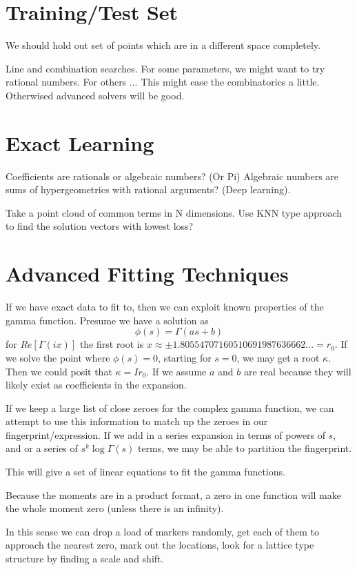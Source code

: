 \documentclass{article}
\begin{document}
\section{Training/Test Set}
We should hold out set of points which are in a different space completely. 

Line and combination searches. 
For some parameters, we might want to try rational numbers.
For others ...
This might ease the combinatorics a little.
Otherwised advanced solvers will be good.


\section{Exact Learning}
Coefficients are rationals or algebraic numbers? (Or Pi)
Algebraic numbers are sums of hypergeometrics with rational arguments? (Deep learning).

Take a point cloud of common terms in N dimensions.
Use KNN type approach to find the solution vectors with lowest loss?




\section{Advanced Fitting Techniques}
If we have exact data to fit to, then we can exploit known properties of the gamma function. Presume we have a solution as 
$$
\phi(s) = \Gamma(a s + b)
$$
for $Re[\Gamma(ix)]$ the first root is $x \approx \pm 1.80554707160510691987636662... = r_0 $. If we solve the point where $\phi(s)=0$, starting for $s=0$, we may get a root $\kappa$. Then we could posit that $\kappa = I r_0$. If we assume $a$ and $b$ are real because they will likely exist as coefficients in the expansion. 

If we keep a large list of close zeroes for the complex gamma function, we can attempt to use this information to match up the zeroes in our fingerprint/expression. If we add in a series expansion in terms of powers of $s$, and or a series of $s^k \log \Gamma(s)$ terms, we may be able to partition the fingerprint.

This will give a set of linear equations to fit the gamma functions.

Because the moments are in a product format, a zero in one function will make the whole moment zero (unless there is an infinity).

In this sense we can drop a load of markers randomly, get each of them to approach the nearest zero, mark out the locations, look for a lattice type structure by finding a scale and shift.
\end{document}
